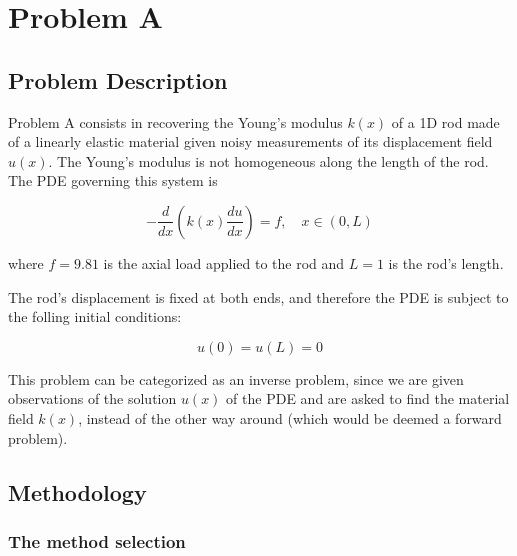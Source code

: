 \chapter{Problem A}
\label{ch:problem_A}
%

%



\section{Problem Description}

Problem A consists in recovering the Young's modulus $k(x)$ of a 1D rod made of a linearly elastic material given noisy measurements of its displacement field $u(x)$. The Young's modulus is not homogeneous along the length of the rod. The PDE governing this system is

\begin{equation}
	-\frac{d}{dx} \left( k(x) \frac{du}{dx} \right) = f, \quad x \in (0, L)
\end{equation}

\noindent
where $f = 9.81$ is the axial load applied to the rod and $L = 1$ is the rod's length.

The rod's displacement is fixed at both ends, and therefore the PDE is subject to the folling initial conditions:

\begin{equation}
	u(0) = u(L) = 0
\end{equation}

This problem can be categorized as an inverse problem, since we are given observations of the solution $u(x)$ of the PDE and are asked to find the material field $k(x)$, instead of the other way around (which would be deemed a forward problem).

%
\section{Methodology}
%
\subsection{The method selection}


%
%
%

